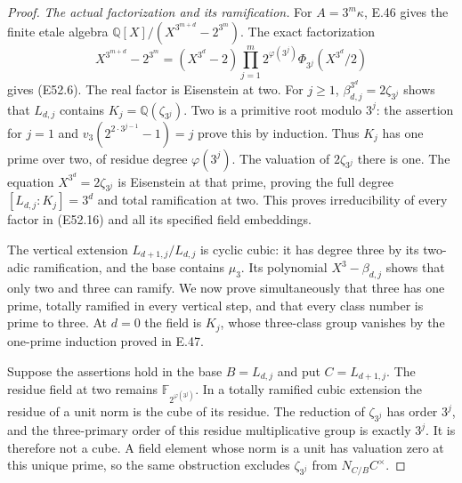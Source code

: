 \begin{proof}
\emph{The actual factorization and its ramification.}
For $A=3^m\kappa$, E.46 gives the finite
etale algebra
$\mathbb Q[X]/(X^{3^{m+d}}-2^{3^m})$.
The exact factorization
\[
 X^{3^{m+d}}-2^{3^m}
  =(X^{3^d}-2)
    \prod_{j=1}^m
       2^{\varphi(3^j)}
          \Phi_{3^j}(X^{3^d}/2)
 \tag{E52.16}
\]
gives (E52.6).
The real factor is Eisenstein at two.
For $j\ge1$, $\beta_{d,j}^{3^d}=2\zeta_{3^j}$
shows that $L_{d,j}$ contains
$K_j=\mathbb Q(\zeta_{3^j})$.
Two is a primitive root modulo $3^j$:
the assertion for $j=1$ and
$v_3(2^{2\cdot3^{j-1}}-1)=j$ prove this
by induction. Thus $K_j$ has one prime
over two, of residue degree
$\varphi(3^j)$.
The valuation of $2\zeta_{3^j}$ there
is one. The equation
$X^{3^d}=2\zeta_{3^j}$ is Eisenstein
at that prime, proving the full degree
$[L_{d,j}:K_j]=3^d$ and total
ramification at two.
This proves irreducibility of every
factor in (E52.16) and all its
specified field embeddings.

The vertical extension
$L_{d+1,j}/L_{d,j}$ is cyclic cubic:
it has degree three by its
two-adic ramification, and the base
contains $\mu_3$.
Its polynomial $X^3-\beta_{d,j}$
shows that only two and three can
ramify. We now prove simultaneously
that three has one prime, totally
ramified in every vertical step,
and that every class number is
prime to three.
At $d=0$ the field is $K_j$,
whose three-class group vanishes
by the one-prime induction proved
in E.47.

Suppose the assertions hold in the
base $B=L_{d,j}$ and put $C=L_{d+1,j}$.
The residue field at two remains
$\mathbb F_{2^{\varphi(3^j)}}$.
In a totally ramified cubic extension
the residue of a unit norm is the
cube of its residue. The reduction
of $\zeta_{3^j}$ has order $3^j$,
and the three-primary order of
this residue multiplicative group
is exactly $3^j$. It is therefore
not a cube. A field element whose
norm is a unit has valuation zero
at this unique prime, so the same
obstruction excludes $\zeta_{3^j}$
from $N_{C/B}C^\times$.


\end{proof}

